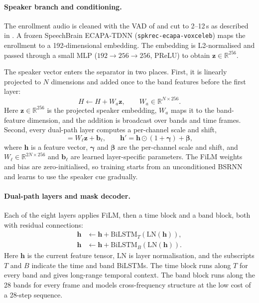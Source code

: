 \documentclass[11pt,a4paper]{article}
\begin{document}
\paragraph{Speaker branch and conditioning.}
The enrollment audio is cleaned with the VAD of  and cut to 2--12\,s as described in
. A frozen SpeechBrain ECAPA-TDNN (\texttt{spkrec-ecapa-voxceleb})
\cite{ravanelli2021speechbrain,desplanques2020ecapa} maps the enrollment to a 192-dimensional
embedding. The embedding is L2-normalised and passed through a small MLP
($192\to256\to256$, PReLU) to obtain $\mathbf{z}\in\mathbb{R}^{256}$.

The speaker vector enters the separator in two places. First, it is linearly projected to $N$
dimensions and added once to the band features before the first layer:
\begin{equation}
  H\leftarrow H+W_a\mathbf{z},
  \qquad W_a\in\mathbb{R}^{N\times256}.
\end{equation}
Here $\mathbf{z}\in\mathbb{R}^{256}$ is the projected speaker embedding, $W_a$ maps it to the
band-feature dimension, and the addition is broadcast over bands and time frames.
Second, every dual-path layer computes a per-channel scale and shift,
\begin{equation}
  [\boldsymbol\gamma,\boldsymbol\beta]=W_\ell\mathbf{z}+\mathbf{b}_\ell,
  \qquad
  \mathbf{h}'=\mathbf{h}\odot(1+\boldsymbol\gamma)+\boldsymbol\beta,
  \label{eq:film}
\end{equation}
where $\mathbf{h}$ is a feature vector, $\boldsymbol\gamma$ and $\boldsymbol\beta$ are the
per-channel scale and shift, and $W_\ell\in\mathbb{R}^{2N\times256}$ and $\mathbf{b}_\ell$ are
learned layer-specific parameters. The FiLM weights and bias are zero-initialised, so
training starts from an unconditioned BSRNN and learns to use the speaker cue gradually.

\paragraph{Dual-path layers and mask decoder.}
Each of the eight layers applies FiLM, then a time block and a band block, both with residual
connections:
\begin{align}
  \mathbf{h} &\leftarrow \mathbf{h}+\mathrm{BiLSTM}_{T}\!\left(\mathrm{LN}(\mathbf{h})\right),\\
  \mathbf{h} &\leftarrow \mathbf{h}+\mathrm{BiLSTM}_{B}\!\left(\mathrm{LN}(\mathbf{h})\right).
\end{align}
Here $\mathbf{h}$ is the current feature tensor, $\mathrm{LN}$ is layer normalisation, and the
subscripts $T$ and $B$ indicate the time and band BiLSTMs. The time block runs along $T$ for every band and gives long-range temporal context. The band
block runs along the 28 bands for every frame and models cross-frequency structure at the low cost
of a 28-step sequence.
\end{document}
